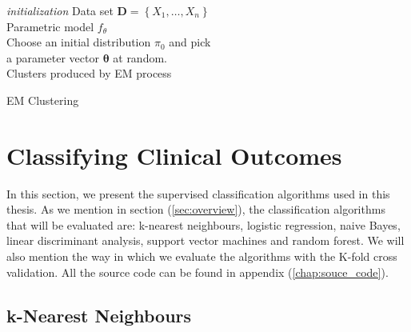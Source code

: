 \documentclass[../thesis.tex]{subfiles}
\begin{document}
\begin{algorithm}[H]{
\SetAlgoLined
\textit{initialization}\;
    \hspace*{0,5cm}Data set $\mathbf{D} = \left \{X_1, \hdots, X_n \right\}$\\
    \hspace*{0,5cm}Parametric model $f_\theta$\\
    \hspace*{0,5cm}Choose an initial distribution $\pi_0$ and pick\\ \hspace*{1cm}a parameter vector $\boldsymbol{\theta}$ at random.\\
    \Return Clusters produced by EM process
}
\caption{EM Clustering}
\end{algorithm}

\vspace*{-0,25cm}\section{Classifying Clinical Outcomes}
\label{sec:classify_clin_out}

\noindent In this section, we present the supervised classification algorithms used in this thesis. As we mention in section (\ref{sec:overview}), the classification algorithms that will be evaluated are: k-nearest neighbours, logistic regression, naive Bayes, linear discriminant analysis, support vector machines and random forest. We will also mention the way in which we evaluate the algorithms with the K-fold cross validation. All the source code can be found in appendix (\ref{chap:souce_code}).

\subsection{k-Nearest Neighbours}
\label{subsec:knn}
\end{document}
